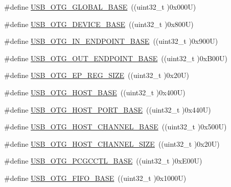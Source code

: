 \begin{DoxyCompactItemize}
\item 
\#define \hyperlink{group___peripheral__registers__structures_ga044aa4388e72d9d47a03f387fb8926fb}{U\+S\+B\+\_\+\+O\+T\+G\+\_\+\+G\+L\+O\+B\+A\+L\+\_\+\+B\+A\+SE}~((uint32\+\_\+t )0x000\+U)
\item 
\#define \hyperlink{group___peripheral__registers__structures_ga4d74a337597a77b1fca978202b519a18}{U\+S\+B\+\_\+\+O\+T\+G\+\_\+\+D\+E\+V\+I\+C\+E\+\_\+\+B\+A\+SE}~((uint32\+\_\+t )0x800\+U)
\item 
\#define \hyperlink{group___peripheral__registers__structures_gad8f69041452615aeb3948600e3882246}{U\+S\+B\+\_\+\+O\+T\+G\+\_\+\+I\+N\+\_\+\+E\+N\+D\+P\+O\+I\+N\+T\+\_\+\+B\+A\+SE}~((uint32\+\_\+t )0x900\+U)
\item 
\#define \hyperlink{group___peripheral__registers__structures_gaf0e972b8f028ecf44a652029efbd4642}{U\+S\+B\+\_\+\+O\+T\+G\+\_\+\+O\+U\+T\+\_\+\+E\+N\+D\+P\+O\+I\+N\+T\+\_\+\+B\+A\+SE}~((uint32\+\_\+t )0x\+B00\+U)
\item 
\#define \hyperlink{group___peripheral__registers__structures_ga6fdb7429ad88e2d69440d6ecc4f4199e}{U\+S\+B\+\_\+\+O\+T\+G\+\_\+\+E\+P\+\_\+\+R\+E\+G\+\_\+\+S\+I\+ZE}~((uint32\+\_\+t )0x20\+U)
\item 
\#define \hyperlink{group___peripheral__registers__structures_ga3bb2dd6c82eefd8587b6146ba36ae071}{U\+S\+B\+\_\+\+O\+T\+G\+\_\+\+H\+O\+S\+T\+\_\+\+B\+A\+SE}~((uint32\+\_\+t )0x400\+U)
\item 
\#define \hyperlink{group___peripheral__registers__structures_ga42f433cb79ca69f09972e690fda6737a}{U\+S\+B\+\_\+\+O\+T\+G\+\_\+\+H\+O\+S\+T\+\_\+\+P\+O\+R\+T\+\_\+\+B\+A\+SE}~((uint32\+\_\+t )0x440\+U)
\item 
\#define \hyperlink{group___peripheral__registers__structures_ga942c8c5241b80fbcf638fea0fa18bebd}{U\+S\+B\+\_\+\+O\+T\+G\+\_\+\+H\+O\+S\+T\+\_\+\+C\+H\+A\+N\+N\+E\+L\+\_\+\+B\+A\+SE}~((uint32\+\_\+t )0x500\+U)
\item 
\#define \hyperlink{group___peripheral__registers__structures_ga266cb1dbb50faf447f9c15d2ee93a522}{U\+S\+B\+\_\+\+O\+T\+G\+\_\+\+H\+O\+S\+T\+\_\+\+C\+H\+A\+N\+N\+E\+L\+\_\+\+S\+I\+ZE}~((uint32\+\_\+t )0x20\+U)
\item 
\#define \hyperlink{group___peripheral__registers__structures_gaa9766975aca084c257730879568bc7cf}{U\+S\+B\+\_\+\+O\+T\+G\+\_\+\+P\+C\+G\+C\+C\+T\+L\+\_\+\+B\+A\+SE}~((uint32\+\_\+t )0x\+E00\+U)
\item 
\#define \hyperlink{group___peripheral__registers__structures_gace340350802904868673f0e839c4fa04}{U\+S\+B\+\_\+\+O\+T\+G\+\_\+\+F\+I\+F\+O\+\_\+\+B\+A\+SE}~((uint32\+\_\+t )0x1000\+U)

\end{DoxyCompactItemize}
